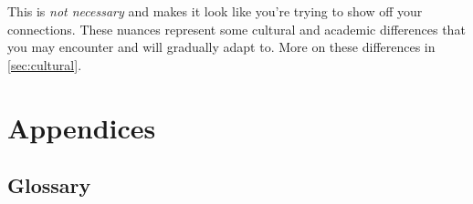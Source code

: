 \documentclass[oneside,11pt,dvipsnames]{book}
\newcommand{\mycomment}[3][\color{blue}]{{#1{{#2}: {#3}}}}
\newcommand{\tvn}[1]{\mycomment{TVN}{#1}}{}
\begin{document}
This is \emph{not necessary} and makes it look like you're trying to show off your connections. These nuances represent some cultural and academic differences that you may encounter and will gradually adapt to. More on these differences in \autoref{sec:cultural}.








\part{Appendices}\label{part:appendices}
\appendix
\chapter{Glossary}\label{sec:glossary}
\end{document}
